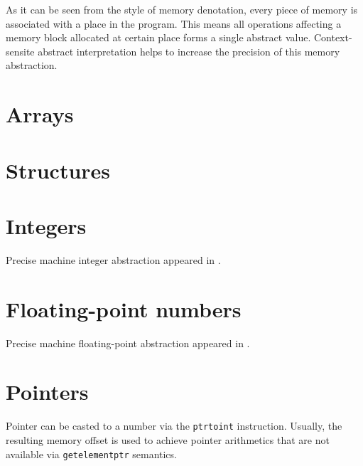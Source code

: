 \documentclass[a4paper]{book}
\begin{document}
As it can be seen from the style of memory denotation, every piece of
memory is associated with a place in the program.  This means all
operations affecting a memory block allocated at certain place forms a
single abstract value.  Context-sensite abstract interpretation helps
to increase the precision of this memory abstraction.

\section{Arrays}

\section{Structures}

\section{Integers}
Precise machine integer abstraction appeared in \cite{M12}.

\section{Floating-point numbers}
Precise machine floating-point abstraction appeared in \cite{M12}.

\section{Pointers}
Pointer can be casted to a number via the \texttt{ptrtoint}
instruction.  Usually, the resulting memory offset is used to achieve
pointer arithmetics that are not available via \texttt{getelementptr}
semantics.
\end{document}
